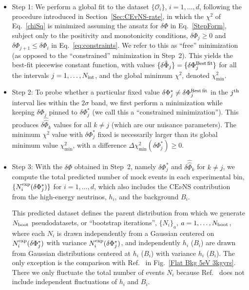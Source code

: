 \documentclass[a4paper,11pt]{article}
\renewcommand\({\left(}
\renewcommand\){\right)}
\renewcommand\[{\left[}
\renewcommand\]{\right]}
\theoremstyle{definition}
\newcommand{\CEnNS}{\text{CE}\nu\text{NS}}
\begin{document}
\begin{itemize}
\item{Step 1: We perform a  global fit to the dataset $\{\mathcal{O}_i\}$, $i = 1, \ldots, d$, following the procedure introduced in Section~\ref{Sec:CEvNS-rate}, in which the $\chi^2$ of Eq.~\eqref{chiSq} is minimized assuming the ansatz for $\delta\Phi$ in Eq.~\eqref{StepForm}, subject only to the positivity and monotonicity conditions, $\delta\Phi_j \geq 0$ and $\delta\Phi_{j+1} \leq \delta\Phi_i$ in Eq.~\eqref{eq:constraints}. We refer to this as ``free'' minimization (as opposed to the ``constrained'' minimization in Step~2). This yields the best-fit piecewise constant function, with values $\{{\delta \hat\Phi}_j\}=\{\delta\Phi^{\rm Best\,fit}_j\}$ for all the  intervals  $j= 1, \ldots, N_{\rm int}$, and the global minimum $\chi^2$, denoted $\chi^2_{\min}$. 
}

\item{Step 2: To probe whether a particular fixed value $\delta\Phi_j^*\neq \delta\Phi^{\rm Best\,fit}_j$ in the $j^{\rm th}$ interval lies within the $2\sigma$ band, we first perform a minimization while keeping $\delta\Phi_j$ pinned to $\delta\Phi_j^*$ (we call this a ``constrained minimization''). This produces ${\delta\hat{\hat \Phi}}_k$ values for all $k \neq j$ (which are our nuisance parameters). The minimum $\chi^2$ value with $\delta\Phi_j^*$ fixed is necessarily larger than its global minimum value $\chi^2_{\min}$, with a difference \mbox{$\Delta\chi^2_{\min}(\delta\Phi_j^*)\ge 0$.}}

\item{Step 3: With the $\delta\Phi$ obtained in Step~2, namely $\delta\Phi_j^*$ and $ {\delta\hat{\hat \Phi}}_k$ for $k \neq j$,  we compute the total predicted  number of mock events in each experimental bin, $\{N_i^{\rm exp}(\delta\Phi_j^*)\}$ for $i= 1, \dots , d$, which also includes  the $\CEnNS$ contribution from the high-energy neutrinos, $h_i$, and the background $B_i$.

This predicted dataset  defines the parent distribution from which we generate $N_{\rm boot}$ pseudodatasets, or ``bootstrap iterations'',  $\{N_i\}_a$, $a = 1, \dots, N_{\rm boot}$, where each $N_i$ is drawn independently from a Gaussian centered on $N_i^{\rm exp}(\delta\Phi_j^*)$ with variance $N_i^{\rm exp}(\delta\Phi_j^*)$, and independently $h_i$ ($B_i$) are drawn from Gaussian distributions centered at $h_i$ ($B_i$) with variance $h_i$ ($B_i$).
The only exception is the comparison with Ref.~\cite{Liao:2023kyy} in Fig.~\ref{Flat Bkg 5eV 3kgyrs}. There we only fluctuate the total number of events ${N_i}$ because Ref.~\cite{Liao:2023kyy} does not include independent fluctuations of $h_i$ and $B_i$.

}
\end{itemize}
\end{document}
